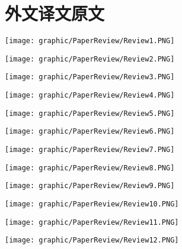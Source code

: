 \newpage
\section*{外文译文原文}
\begin{center}
\texttt{[image: graphic/PaperReview/Review1.PNG]}
\end{center}

\begin{center}
\texttt{[image: graphic/PaperReview/Review2.PNG]}
\end{center}

\begin{center}
\texttt{[image: graphic/PaperReview/Review3.PNG]}
\end{center}

\begin{center}
\texttt{[image: graphic/PaperReview/Review4.PNG]}
\end{center}

\begin{center}
\texttt{[image: graphic/PaperReview/Review5.PNG]}
\end{center}

\begin{center}
\texttt{[image: graphic/PaperReview/Review6.PNG]}
\end{center}

\begin{center}
\texttt{[image: graphic/PaperReview/Review7.PNG]}
\end{center}

\begin{center}
\texttt{[image: graphic/PaperReview/Review8.PNG]}
\end{center}

\begin{center}
\texttt{[image: graphic/PaperReview/Review9.PNG]}
\end{center}

\begin{center}
\texttt{[image: graphic/PaperReview/Review10.PNG]}
\end{center}

\begin{center}
\texttt{[image: graphic/PaperReview/Review11.PNG]}
\end{center}

\begin{center}
\texttt{[image: graphic/PaperReview/Review12.PNG]}
\end{center}
